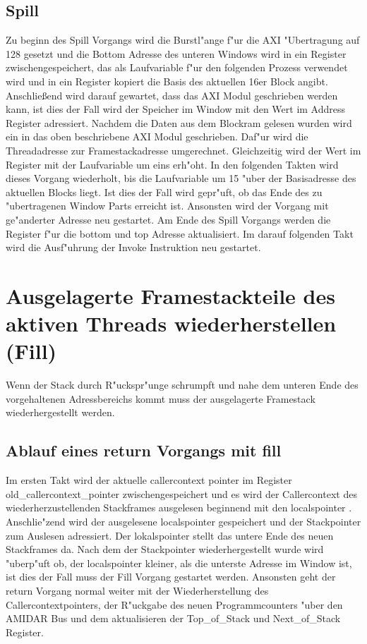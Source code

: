 \subsection{Spill}
Zu beginn des Spill Vorgangs wird die Burstl"ange f"ur die AXI "Ubertragung auf 128 gesetzt und die Bottom Adresse des unteren Windows wird in ein Register zwischengespeichert, das als Laufvariable f"ur den folgenden Prozess verwendet wird und in ein Register kopiert die Basis des aktuellen 16er Block angibt. 
Anschlie{\ss}end wird darauf gewartet, dass das AXI Modul geschrieben werden kann, ist dies der Fall wird der Speicher im Window mit den Wert im Address Register adressiert. 
Nachdem die Daten aus dem Blockram gelesen wurden wird ein in das oben beschriebene AXI Modul geschrieben. Daf"ur wird die Threadadresse zur Framestackadresse umgerechnet. Gleichzeitig wird der Wert im Register mit der Laufvariable um eins erh"oht.  In den folgenden Takten wird dieses Vorgang wiederholt, bis die Laufvariable um 15 "uber der Basisadresse des aktuellen Blocks liegt. Ist dies der Fall wird gepr"uft, ob das Ende des zu "ubertragenen Window Parts erreicht ist. Ansonsten wird der Vorgang mit ge"anderter Adresse neu gestartet. 
Am Ende des Spill Vorgangs werden die Register f"ur die bottom und top Adresse aktualisiert. Im darauf folgenden Takt wird die Ausf"uhrung der Invoke Instruktion neu gestartet.


\section{Ausgelagerte Framestackteile des aktiven Threads wiederherstellen (Fill)}
Wenn der Stack durch R"uckspr"unge schrumpft und nahe dem unteren Ende des vorgehaltenen Adressbereichs kommt muss der ausgelagerte Framestack wiederhergestellt werden. 

\subsection{Ablauf eines return Vorgangs mit fill}
Im ersten Takt wird der aktuelle callercontext pointer im Register old\_callercontext\_pointer zwischengespeichert und es wird der Callercontext des wiederherzustellenden Stackframes ausgelesen beginnend mit den localspointer . 
Anschlie"zend wird der ausgelesene localspointer gespeichert und der Stackpointer zum Auslesen adressiert. Der lokalspointer stellt das untere Ende des neuen Stackframes da. Nach dem der Stackpointer wiederhergestellt wurde wird "uberp"uft ob, der localspointer kleiner, als die unterste Adresse im Window ist, ist dies der Fall muss der Fill Vorgang gestartet werden.  
Ansonsten geht der return Vorgang normal weiter mit der Wiederherstellung des Callercontextpointers, der R"uckgabe des neuen Programmcounters "uber den AMIDAR Bus und dem aktualisieren der Top\_of\_Stack und Next\_of\_Stack Register. 

